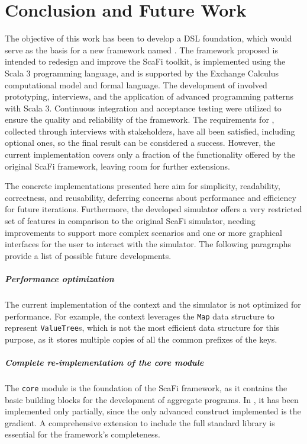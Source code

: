 \chapter{Conclusion and Future Work}
\label{chap:conclusion-and-future-work}

The objective of this work has been to develop a \ac{DSL} foundation, which would serve as the basis for a new framework named \this.
%
The framework proposed is intended to redesign and improve the ScaFi toolkit, is implemented using the Scala 3 programming language, and is supported by the Exchange Calculus computational model and formal language.
%
The development of \this involved prototyping, interviews, and the application of advanced programming patterns with Scala 3.
%
Continuous integration and acceptance testing were utilized to ensure the quality and reliability of the framework.
%
The requirements for \this, collected through interviews with stakeholders, have all been satisfied, including optional ones, so the final result can be considered a success.
%
However, the current implementation covers only a fraction of the functionality offered by the original ScaFi framework, leaving room for further extensions.

The concrete implementations presented here aim for simplicity, readability, correctness, and reusability, deferring concerns about performance and efficiency for future iterations.
%
Furthermore, the developed simulator offers a very restricted set of features in comparison to the original ScaFi simulator, needing improvements to support more complex scenarios and one or more graphical interfaces for the user to interact with the simulator.
%
The following paragraphs provide a list of possible future developments.

\paragraph{Performance optimization} The current implementation of the context and the simulator is not optimized for performance.
%
For example, the context leverages the \texttt{Map} data structure to represent \texttt{ValueTree}s, which is not the most efficient data structure for this purpose, as it stores multiple copies of all the common prefixes of the keys.

\paragraph{Complete re-implementation of the core module} The \texttt{core} module is the foundation of the ScaFi framework, as it contains the basic building blocks for the development of aggregate programs.
%
In \this, it has been implemented only partially, since the only advanced construct implemented is the gradient.
%
A comprehensive extension to include the full standard library is essential for the framework's completeness.

